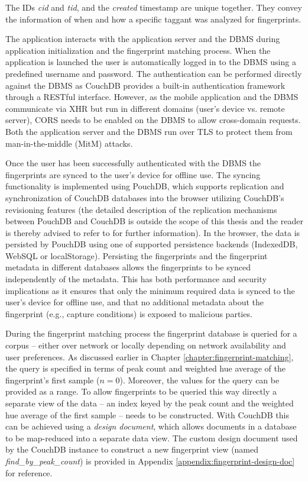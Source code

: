 \documentclass[thesis.tex]{subfiles}
\begin{document}
\noindent The IDs \emph{cid} and \emph{tid}, and the \emph{created} timestamp are unique together. They convey the information of when and how a specific taggant was analyzed for fingerprints.

The application interacts with the application server and the DBMS during application initialization and the fingerprint matching process. When the application is launched the user is automatically logged in to the DBMS using a predefined username and password. The authentication can be performed directly against the DBMS as CouchDB provides a built-in authentication framework through a RESTful interface. However, as the mobile application and the DBMS communicate via XHR but run in different domains (user's device vs. remote server), CORS needs to be enabled on the DBMS to allow cross-domain requests. Both the application server and the DBMS run over TLS to protect them from man-in-the-middle (MitM) attacks.

Once the user has been successfully authenticated with the DBMS the fingerprints are synced to the user's device for offline use. The syncing functionality is implemented using PouchDB, which supports replication and synchronization of CouchDB databases into the browser utilizing CouchDB's revisioning features (the detailed description of the replication mechanisms between PouchDB and CouchDB is outside the scope of this thesis and the reader is thereby advised to refer to \cite{pouch-couch-replication} for further information). In the browser, the data is persisted by PouchDB using one of supported persistence backends (IndexedDB, WebSQL or localStorage). Persisting the fingerprints and the fingerprint metadata in different databases allows the fingerprints to be synced independently of the metadata. This has both performance and security implications as it ensures that only the minimum required data is synced to the user's device for offline use, and that no additional metadata about the fingerprint (e.g., capture conditions) is exposed to malicious parties.

During the fingerprint matching process the fingerprint database is queried for a corpus -- either over network or locally depending on network availability and user preferences. As discussed earlier in Chapter \ref{chapter:fingerprint-matching}, the query is specified in terms of peak count and weighted hue average of the fingerprint's first sample ($n=0$). Moreover, the values for the query can be provided as a range. To allow fingerprints to be queried this way directly a separate view of the data -- an index keyed by the peak count and the weighted hue average of the first sample -- needs to be constructed. With CouchDB this can be achieved using a \emph{design document}, which allows documents in a database to be map-reduced into a separate data view. The custom design document used by the CouchDB instance to construct a new fingerprint view (named \emph{find\_by\_peak\_count}) is provided in Appendix \ref{appendix:fingerprint-design-doc} for reference.
\end{document}
